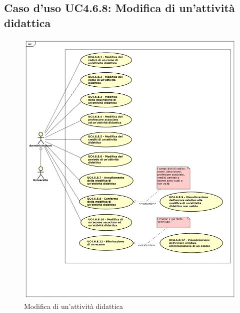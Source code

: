 \subsection{Caso d'uso \texorpdfstring{UC4.6.8}{UC4.6.8}: Modifica di un'attività didattica}
\begin{figure} [H]
	\centering
	\includegraphics[scale=0.45]{./img/UC4-6-8.pdf}
	\caption{Modifica di un'attività didattica}\label{}
\end{figure}
